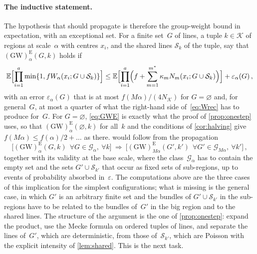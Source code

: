 \documentclass[11pt,letterpaper]{article}
\newcommand{\cS}{\mathcal S}
\begin{document}
\paragraph{The inductive statement.} The hypothesis that should propagate is therefore the group-weight bound in expectation, with an exceptional set. For a finite set~$G$ of lines, a tuple $k\in\mathcal K$ of regions at scale~$\alpha$ with centres $x_i$, and the shared lines $\cS_k$ of the tuple, say that $\mathrm{(GW)}^{\mathrm E}_\alpha(G,k)$ holds if
\begin{equation}
\label{eq:GWE}
  \E\Bigl[\prod_{i=1}^a\min\{1,fW_\alpha(x_i;G\cup\cS_k)\}\Bigr]\le\E\Bigl[\prod_{i=1}^a\Bigl(f+\sum_{m=1}^{m^*}\kappa_mN_m(x_i;G\cup\cS_k)\Bigr)\Bigr]+\varepsilon_\alpha(G)\,,
\end{equation}
with an error $\varepsilon_\alpha(G)$ that is at most $f(M\alpha)/(4N_{\mathcal K})$ for $G=\varnothing$ and, for general~$G$, at most a quarter of what the right-hand side of~\eqref{eq:Wrec} has to produce for~$G$. For $G=\varnothing$, \eqref{eq:GWE} is exactly what the proof of \cref{prop:onestep} uses, so that $\mathrm{(GW)}^{\mathrm E}_\alpha(\varnothing,k)$ for all~$k$ and the conditions of \cref{cor:halving} give $f(M\alpha)\le f(\alpha)/2+\dots$ as there.  would follow from the propagation
\begin{equation}
\label{eq:propagate}
  \bigl[\mathrm{(GW)}^{\mathrm E}_\alpha(G,k)\ \ \forall G\in\mathcal G_\alpha,\ \forall k\bigr]\ \Longrightarrow\ \bigl[\mathrm{(GW)}^{\mathrm E}_{M\alpha}(G',k')\ \ \forall G'\in\mathcal G_{M\alpha},\ \forall k'\bigr]\,,
\end{equation}
together with its validity at the base scale, where the class~$\mathcal G_\alpha$ has to contain the empty set and the sets $G'\cup\cS_{k'}$ that occur as fixed sets of sub-regions, up to events of probability absorbed in~$\varepsilon$. The computations above are the three cases of this implication for the simplest configurations; what is missing is the general case, in which $G'$ is an arbitrary finite set and the bundles of $G'\cup\cS_{k'}$ in the sub-regions have to be related to the bundles of~$G'$ in the big region and to the shared lines. The structure of the argument is the one of \cref{prop:onestep}: expand the product, use the Mecke formula on ordered tuples of lines, and separate the lines of~$G'$, which are deterministic, from those of~$\cS_{k'}$, which are Poisson with the explicit intensity of \cref{lem:shared}. This is the next task.
\end{document}
